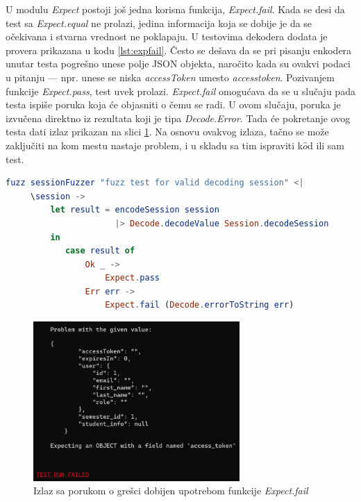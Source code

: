 \documentclass[12pt,oneside]{memoir}
\begin{document}
\par U modulu \emph{Expect} postoji još jedna korisna funkcija, \emph{Expect.fail}. Kada se desi da test sa \emph{Expect.equal} ne prolazi, jedina informacija koja se dobije je da se očekivana i stvarna vrednost ne poklapaju. U testovima dekodera dodata je provera prikazana u kodu \ref{lst:expfail}. Često se dešava da se pri pisanju enkodera unutar testa pogrešno unese polje JSON objekta, naročito kada su ovakvi podaci u pitanju --- npr. unese se niska \emph{accessToken} umesto \emph{access{\textunderscore}token}. Pozivanjem funkcije \emph{Expect.pass}, test uvek prolazi. \emph{Expect.fail} omogućava da se u slučaju pada testa ispiše poruka koja će objasniti o čemu se radi. U ovom slučaju, poruka je izvučena direktno iz rezultata koji je tipa \emph{Decode.Error}. Tada će pokretanje ovog testa dati izlaz prikazan na slici \ref{fig:expfail}. Na osnovu ovakvog izlaza, tačno se može zaključiti na kom mestu nastaje problem, i u skladu sa tim ispraviti k$\hat{o}$d ili sam test.

\begin{lstlisting}[language=elm, caption={Implementacija testa koji izbacuje poruku u slučaju da ne prolazi},captionpos=b, label={lst:expfail}]
fuzz sessionFuzzer "fuzz test for valid decoding session" <| 
     \session -> 
         let result = encodeSession session 
                      |> Decode.decodeValue Session.decodeSession
         in 
            case result of 
                Ok _ -> 
                    Expect.pass
                Err err -> 
                    Expect.fail (Decode.errorToString err)
\end{lstlisting}

\begin{figure}[!ht]
  \centering
  \label{fig:expfail}
  \includegraphics[width=0.7\textwidth]{expfail.png}
  \caption{Izlaz sa porukom o grešci dobijen upotrebom funkcije \emph{Expect.fail}}
\end{figure}
\end{document}
